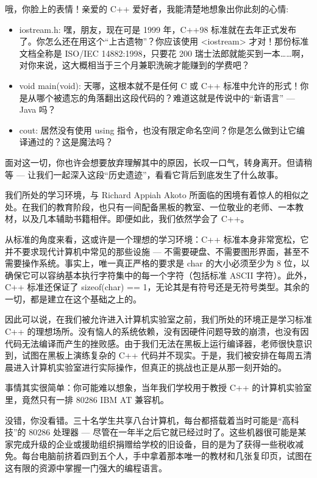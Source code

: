 
哦，你脸上的表情！亲爱的 C++ 爱好者，我能清楚地想象出你此刻的心情:

\begin{itemize}
\item 
iostream.h: 嘿，朋友，现在可是 1999 年，C++98 标准就在去年正式发布了。你怎么还在用这个“上古遗物”？你应该使用 <iostream> 才对！那份标准文档全称是 ISO/IEC 14882:1998，只要花 200 瑞士法郎就能买到一本……啊，对你来说，这大概相当于三个月兼职洗碗才能赚到的学费吧？

\item 
void main(void): 天哪，这根本就不是任何 C 或 C++ 标准中允许的形式！你是从哪个被遗忘的角落翻出这段代码的？难道这就是传说中的“新语言” --- Java 吗？

\item 
cout: 居然没有使用 using 指令，也没有限定命名空间？你是怎么做到让它编译通过的？这是魔法吗？
\end{itemize}

面对这一切，你也许会想要放弃理解其中的原因，长叹一口气，转身离开。但请稍等 --- 让我们一起深入这段“历史遗迹”，看看它背后到底发生了什么故事。

我们所处的学习环境，与 Richard Appiah Akoto 所面临的困境有着惊人的相似之处。在我们的教育阶段，也只有一间配备黑板的教室、一位敬业的老师、一本教材，以及几本辅助书籍相伴。即便如此，我们依然学会了 C++。

从标准的角度来看，这或许是一个理想的学习环境：C++ 标准本身非常宽松，它并不要求现代计算机中常见的那些设施 --- 不需要硬盘、不需要图形界面，甚至不需要操作系统。事实上，唯一真正严格的要求是 char 的大小必须至少为 8 位，以确保它可以容纳基本执行字符集中的每一个字符（包括标准 ASCII 字符）。此外，C++ 标准还保证了 sizeof(char) == 1，无论其是有符号还是无符号类型。其余的一切，都是建立在这个基础之上的。

因此可以说，在我们被允许进入计算机实验室之前，我们所处的环境正是学习标准 C++ 的理想场所。没有恼人的系统依赖，没有因硬件问题导致的崩溃，也没有因代码无法编译而产生的挫败感。由于我们无法在黑板上运行编译器，老师很快意识到，试图在黑板上演练复杂的 C++ 代码并不现实。于是，我们被安排在每周五清晨进入计算机实验室进行实际操作，但真正的挑战也正是从那一刻开始的。

事情其实很简单：你可能难以想象，当年我们学校用于教授 C++ 的计算机实验室里，竟然只有一排 80286 IBM AT 兼容机。

没错，你没看错。三十名学生共享八台计算机，每台都搭载着当时可能是“高科技”的 80286 处理器 --- 尽管在一年半之后它就已经过时了。这些机器很可能是某家完成升级的企业或援助组织捐赠给学校的旧设备，目的是为了获得一些税收减免。每台电脑前挤着四到五个人，手中拿着那本唯一的教材和几张复印页，试图在这有限的资源中掌握一门强大的编程语言。

